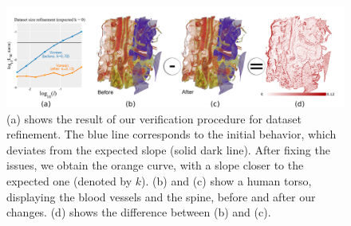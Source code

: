 \begin{figure}[b]
\centering
\includegraphics[width=1\linewidth]{chapter5/figures/teaser.png}
\caption{\label{chap5:fig:teaser} (a) shows the result of our verification procedure
  for dataset refinement. The
  blue line corresponds to the initial behavior, which deviates from
  the expected slope (solid dark line).  After fixing
  the issues, we obtain the orange curve, with a slope closer to the
  expected one (denoted by $k$). (b) and (c) show a
  human torso, displaying the blood vessels and the spine, before and
  after our changes.  (d) shows the difference between (b) and (c).}
\end{figure}




